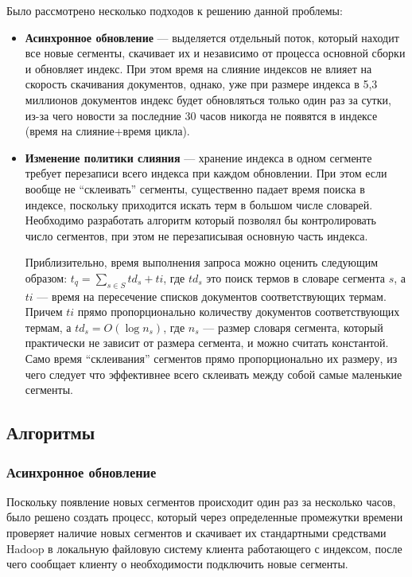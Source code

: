 Было рассмотрено несколько подходов к решению данной проблемы:
\begin{itemize}
 \item \textbf{Асинхронное обновление} --- выделяется отдельный поток, который  находит все новые сегменты, скачивает их и независимо от процесса основной сборки и обновляет индекс. При этом время на слияние индексов не влияет на скорость скачивания документов, однако, уже при размере индекса в 5,3 миллионов документов индекс будет обновляться только один раз за сутки, из-за чего новости за последние 30 часов никогда не появятся в индексе (время на слияние+время цикла).
 \item \textbf{Изменение политики слияния} --- хранение индекса в одном сегменте требует перезаписи всего индекса при каждом обновлении. При этом если вообще не ``склеивать'' сегменты, существенно падает время поиска в индексе, поскольку приходится искать терм в большом числе словарей.\cite{luceneimp} Необходимо разработать алгоритм который позволял бы контролировать число сегментов, при этом не перезаписывая основную часть индекса.

Приблизительно, время выполнения запроса можно оценить следующим образом: $t_{q} = \sum\limits_{s\in S} td_{s} + ti$, где $td_{s}$ это поиск термов в словаре сегмента $s$, а $ti$ --- время на пересечение списков документов соответствующих термам. Причем $ti$ прямо пропорционально количеству документов соответствующих термам, а $td_{s} = O(\log n_{s})$, где $n_{s}$ --- размер словаря сегмента, который практически не зависит от размера сегмента, и можно считать константой. Само время ``склеивания'' сегментов прямо пропорционально их размеру, из чего следует что эффективнее всего склеивать между собой самые маленькие сегменты. 
 
\end{itemize}
\subsection{Алгоритмы}
\subsubsection{Асинхронное обновление}
Поскольку появление новых сегментов происходит один раз за несколько часов, было решено создать процесс, который через определенные промежутки времени проверяет наличие новых сегментов и скачивает их стандартными средствами Hadoop в локальную файловую систему клиента работающего с индексом, после чего сообщает клиенту о необходимости подключить новые сегменты.
